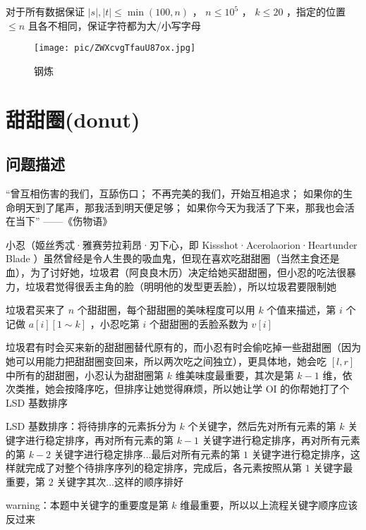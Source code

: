 \documentclass[UTF8]{ctexart}
\begin{document}
对于所有数据保证 $\mid s \mid, \mid t \mid \le \min(100, n)$ ， $n \le 10^5$ ， $k \le 20$ ，指定的位置 $\le n$ 且各不相同，保证字符都为大/小写字母

\begin{figure}[h]
    \centering
    \texttt{[image: pic/ZWXcvgTfauU87ox.jpg]}
    \caption{钢炼}
    \label{fig:enter-label}
\end{figure}


\newpage
\section{甜甜圈(donut)}
\begin{center}
\end{center}
\subsection{问题描述}
“曾互相伤害的我们，互舔伤口；
不再完美的我们，开始互相追求；
如果你的生命明天到了尾声，那我活到明天便足够；
如果你今天为我活了下来，那我也会活在当下”	——《伤物语》

小忍（姬丝秀忒·雅赛劳拉莉昂·刃下心，即 Kissshot·Acerolaorion·Heartunder Blade ）虽然曾经是令人生畏的吸血鬼，但现在喜欢吃甜甜圈（当然主食还是血），为了讨好她，垃圾君（阿良良木历）决定给她买甜甜圈，但小忍的吃法很暴力，垃圾君觉得很丢主角的脸（明明他的发型更丢脸），所以垃圾君要限制她

垃圾君买来了 $n$ 个甜甜圈，每个甜甜圈的美味程度可以用 $k$ 个值来描述，第 $i$ 个记做 $a[i][1 \sim k]$ ，小忍吃第 $i$ 个甜甜圈的丢脸系数为 $v[i]$ 

垃圾君有时会买来新的甜甜圈替代原有的，而小忍有时会偷吃掉一些甜甜圈（因为她可以用能力把甜甜圈变回来，所以两次吃之间独立），更具体地，她会吃 $[l, r]$ 中所有的甜甜圈，小忍认为甜甜圈第 $k$ 维美味度最重要，其次是第 $k - 1$ 维，依次类推，她会按降序吃，但排序让她觉得麻烦，所以她让学 OI 的你帮她打了个 LSD 基数排序

\vspace{5mm}
LSD 基数排序：将待排序的元素拆分为 $k$ 个关键字，然后先对所有元素的第 $k$ 关键字进行稳定排序，再对所有元素的第 $k - 1$ 关键字进行稳定排序，再对所有元素 的第 $k - 2$ 关键字进行稳定排序...最后对所有元素的第 $1$ 关键字进行稳定排序，这样就完成了对整个待排序序列的稳定排序，完成后，各元素按照从第 $1$ 关键字最重要，第 $2$ 关键字其次...这样的顺序排好

warning：本题中关键字的重要度是第 $k$ 维最重要，所以以上流程关键字顺序应该反过来
\vspace{5mm}
\end{document}
